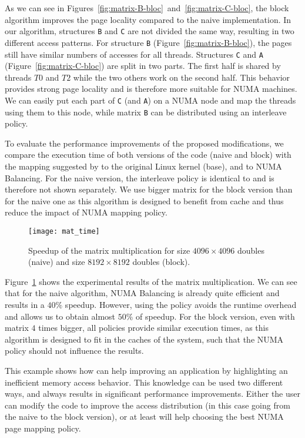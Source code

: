As we can see in Figures~\ref{fig:matrix-B-bloc}~and~\ref{fig:matrix-C-bloc}, the block algorithm improves the page
locality compared to the naive implementation. In our algorithm, structures \texttt{B}
and \texttt{C} are not divided the same way, resulting in two different access patterns. For structure \texttt{B} (Figure~\ref{fig:matrix-B-bloc}), the pages still
have similar numbers of accesses for all threads. Structures \texttt{C} and
\texttt{A} (Figure~\ref{fig:matrix-C-bloc}) are split in two parts. The first half
is shared by threads $T0$ and $T2$ while the two others work on the second
half. This behavior provides strong page locality and is therefore more
suitable for NUMA machines. We can easily put each part of \texttt{C} (and
\texttt{A}) on a NUMA node and map the threads using them to this node, while matrix
\texttt{B} can be distributed using an interleave policy.

To evaluate the performance improvements of the proposed modifications, we compare the execution
time of both versions of the code (naive and block) with the mapping suggested by \TABARNAC to the original Linux kernel (base), and to NUMA Balancing.
For the naive version, the interleave policy is identical to \TABARNAC and is therefore not shown separately.
We use bigger matrix for the block version than for the naive one as this
algorithm is designed to benefit from cache and thus reduce the impact of NUMA
mapping policy.


\begin{figure}[!t]
    \centering
    \texttt{[image: mat\_time]}
    \caption{Speedup of the matrix multiplication for size $4096 \times 4096$
    doubles (naive) and size $8192 \times 8192$ doubles (block).}
    \label{fig:matrix-res}
\end{figure}

Figure~\ref{fig:matrix-res} shows the experimental results of the matrix multiplication. We can see that for
the naive algorithm, NUMA Balancing is already quite efficient and results in a $40\%$
speedup. However, using the \TABARNAC policy avoids the runtime overhead and
allows us to obtain almost $50\%$ of speedup. For the block version, even with
matrix $4$ times bigger, all policies provide similar execution times, as this
algorithm is designed to fit in the caches of the system, such that the NUMA
policy should not influence the results.

This example shows
how \TABARNAC can help improving an application by highlighting an inefficient
memory access behavior. This knowledge can be used two different ways, and always
results in significant performance improvements. Either the user can modify the code to
improve the access distribution (in this case going from the naive to the block version),
or at least \TABARNAC will help choosing the best NUMA page mapping policy.

